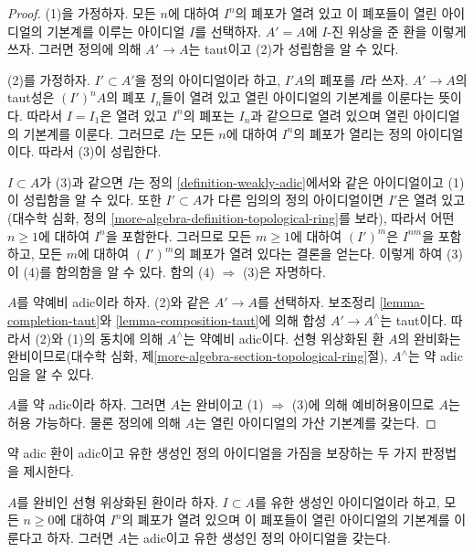 \begin{proof}
(1)을 가정하자. 모든 $n$에 대하여 $I^n$의 폐포가 열려 있고 이
폐포들이 열린 아이디얼의 기본계를 이루는 아이디얼 $I$를 선택하자.
$A' = A$에 $I$-진 위상을 준 환을 이렇게 쓰자. 그러면 정의에 의해
$A' \to A$는 taut이고 (2)가 성립함을 알 수 있다.

\medskip\noindent
(2)를 가정하자. $I' \subset A'$을 정의 아이디얼이라 하고,
$I'A$의 폐포를 $I$라 쓰자. $A' \to A$의 taut성은 $(I')^nA$의
폐포 $I_n$들이 열려 있고 열린 아이디얼의 기본계를 이룬다는
뜻이다. 따라서 $I = I_1$은 열려 있고 $I^n$의 폐포는 $I_n$과
같으므로 열려 있으며 열린 아이디얼의 기본계를 이룬다. 그러므로
$I$는 모든 $n$에 대하여 $I^n$의 폐포가 열리는 정의 아이디얼이다.
따라서 (3)이 성립한다.

\medskip\noindent
$I \subset A$가 (3)과 같으면 $I$는 정의
\ref{definition-weakly-adic}에서와 같은 아이디얼이고 (1)이
성립함을 알 수 있다. 또한 $I' \subset A$가 다른 임의의 정의
아이디얼이면 $I'$은 열려 있고(대수학 심화, 정의
\ref{more-algebra-definition-topological-ring}를 보라), 따라서
어떤 $n \geq 1$에 대하여 $I^n$을 포함한다. 그러므로 모든
$m \geq 1$에 대하여 $(I')^m$은 $I^{nm}$을 포함하고,
모든 $m$에 대하여 $(I')^m$의 폐포가 열려 있다는 결론을 얻는다.
이렇게 하여 (3)이 (4)를 함의함을 알 수 있다.
함의 (4) $\Rightarrow$ (3)은 자명하다.

\medskip\noindent
$A$를 약예비 adic이라 하자. (2)와 같은 $A' \to A$를 선택하자.
보조정리 \ref{lemma-completion-taut}와
\ref{lemma-composition-taut}에 의해 합성 $A' \to A^\wedge$는
taut이다. 따라서 (2)와 (1)의 동치에 의해 $A^\wedge$는 약예비
adic이다. 선형 위상화된 환 $A$의 완비화는 완비이므로(대수학 심화,
제\ref{more-algebra-section-topological-ring}절), $A^\wedge$는 약
adic임을 알 수 있다.

\medskip\noindent
$A$를 약 adic이라 하자. 그러면 $A$는 완비이고
(1) $\Rightarrow$ (3)에 의해 예비허용이므로 $A$는 허용 가능하다.
물론 정의에 의해 $A$는 열린 아이디얼의 가산 기본계를 갖는다.
\end{proof}

\noindent
약 adic 환이 adic이고 유한 생성인 정의 아이디얼을 가짐을
보장하는 두 가지 판정법을 제시한다.

\begin{lemma}
\label{lemma-weakly-adic-finite-generation-bis}
$A$를 완비인 선형 위상화된 환이라 하자. $I \subset A$를 유한 생성인
아이디얼이라 하고, 모든 $n \geq 0$에 대하여 $I^n$의 폐포가 열려
있으며 이 폐포들이 열린 아이디얼의 기본계를 이룬다고 하자.
그러면 $A$는 adic이고 유한 생성인 정의 아이디얼을 갖는다.
\end{lemma}

